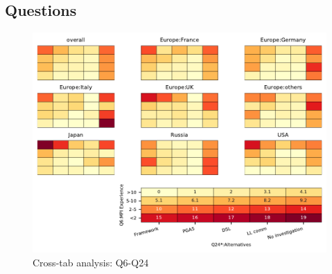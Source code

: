 
\subsection{Questions}


\begin{figure}
\begin{center}
\includegraphics[width=12cm]{../pdfs/Q6-Q24.pdf}
\caption{Cross-tab analysis: Q6-Q24}
\label{fig:Q6-Q24}
\end{center}
\end{figure}
